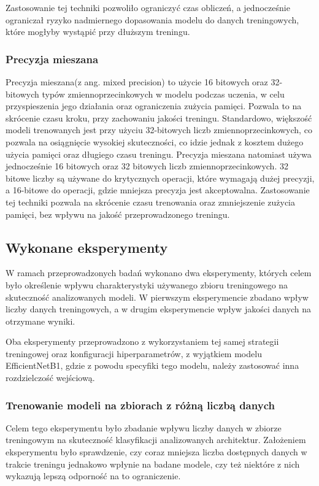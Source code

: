 Zastosowanie tej techniki pozwoliło ograniczyć czas obliczeń, a jednocześnie ograniczał ryzyko nadmiernego dopasowania modelu do danych treningowych, które mogłyby wystąpić przy dłuższym treningu.

\subsubsection{Precyzja mieszana}
Precyzja mieszana(z ang. mixed precision) to użycie 16 bitowych oraz 32-bitowych typów zmiennoprzecinkowych w modelu podczas uczenia, w celu przyspieszenia jego działania oraz ograniczenia zużycia pamięci. Pozwala to na skrócenie czasu kroku, przy zachowaniu jakości treningu. Standardowo, większość modeli trenowanych jest przy użyciu 32-bitowych liczb zmiennoprzecinkowych, co pozwala na osiągnięcie wysokiej skuteczności, co idzie jednak z kosztem dużego użycia pamięci oraz długiego czasu treningu. Precyzja mieszana natomiast używa jednocześnie 16 bitowych oraz 32 bitowych liczb zmiennoprzecinkowych. 32 bitowe liczby są używane do krytycznych operacji, które wymagają dużej precyzji, a 16-bitowe do operacji, gdzie mniejsza precyzja jest akceptowalna. Zastosowanie tej techniki pozwala na skrócenie czasu trenowania oraz zmniejszenie zużycia pamięci, bez wpływu na jakość przeprowadzonego treningu.\cite{nvidia_mixed_precision}


\subsection{Wykonane eksperymenty}
W ramach przeprowadzonych badań wykonano dwa eksperymenty, których celem było określenie wpływu charakterystyki używanego zbioru treningowego na skuteczność analizowanych modeli. W pierwszym eksperymencie zbadano wpływ liczby danych treningowych, a w drugim eksperymencie wpływ jakości danych na otrzymane wyniki.

Oba eksperymenty przeprowadzono z wykorzystaniem tej samej strategii treningowej oraz konfiguracji hiperparametrów, z wyjątkiem modelu EfficientNetB1, gdzie z powodu specyfiki tego modelu, należy zastosować inna rozdzielczość wejściową.

\subsubsection{Trenowanie modeli na zbiorach z różną liczbą danych}
Celem tego eksperymentu było zbadanie wpływu liczby danych w zbiorze treningowym na skuteczność klasyfikacji analizowanych architektur. Założeniem eksperymentu było sprawdzenie, czy coraz mniejsza liczba dostępnych danych w trakcie treningu jednakowo wpłynie na badane modele, czy też niektóre z nich wykazują lepszą odporność na to ograniczenie.

